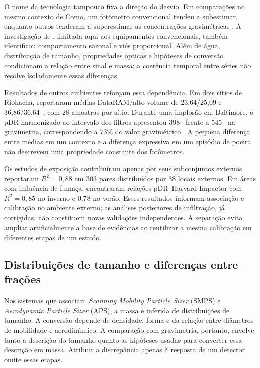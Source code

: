 O nome da tecnologia tampouco fixa a direção do desvio. Em comparações no mesmo contexto de Como, um fotômetro convencional tendeu a subestimar, enquanto outros tenderam a superestimar as concentrações gravimétricas \parencite{rsl388}. A investigação de \textcite{rsl376}, limitada aqui aos equipamentos convencionais, também identificou comportamento sazonal e viés proporcional. Além de água, distribuição de tamanho, propriedades ópticas e hipóteses de conversão condicionam a relação entre sinal e massa; a coerência temporal entre séries não resolve isoladamente essas diferenças.

Resultados de outros ambientes reforçam essa dependência. Em dois sítios de Riohacha, \textcite{rsl226} reportaram médias DataRAM/alto volume de 23,64/25,09 e 36,86/36,64~\ugm{}, com 28 amostras por sítio. Durante uma implosão em Baltimore, o pDR harmonizado ao intervalo dos filtros apresentou 398~\ugm{} frente a 545~\ugm{} na gravimetria, correspondendo a 73\% do valor gravimétrico \parencite{rsl368}. A pequena diferença entre médias em um contexto e a diferença expressiva em um episódio de poeira não descrevem uma propriedade constante dos fotômetros.

Os estudos de exposição contribuíram apenas por seus subconjuntos externos. \textcite{rsl020} reportaram $R^2=0{,}88$ em 303 pares distribuídos por 38 locais externos. Em áreas com influência de fumaça, \textcite{rsl427} encontraram relações pDR--Harvard Impactor com $R^2=0{,}85$ no inverno e 0,78 no verão. Esses resultados informam associação e calibração no ambiente externo; as análises posteriores de infiltração, já corrigidas, não constituem novas validações independentes. A separação evita ampliar artificialmente a base de evidências ao reutilizar a mesma calibração em diferentes etapas de um estudo.

\subsection{Distribuições de tamanho e diferenças entre frações}

Nos sistemas que associam \textit{Scanning Mobility Particle Sizer} (SMPS) e \textit{Aerodynamic Particle Sizer} (APS), a massa é inferida de distribuições de tamanho. A conversão depende de densidade, forma e da relação entre diâmetros de mobilidade e aerodinâmico. A comparação com gravimetria, portanto, envolve tanto a descrição do tamanho quanto as hipóteses usadas para converter essa descrição em massa. Atribuir a discrepância apenas à resposta de um detector omite essas etapas.

